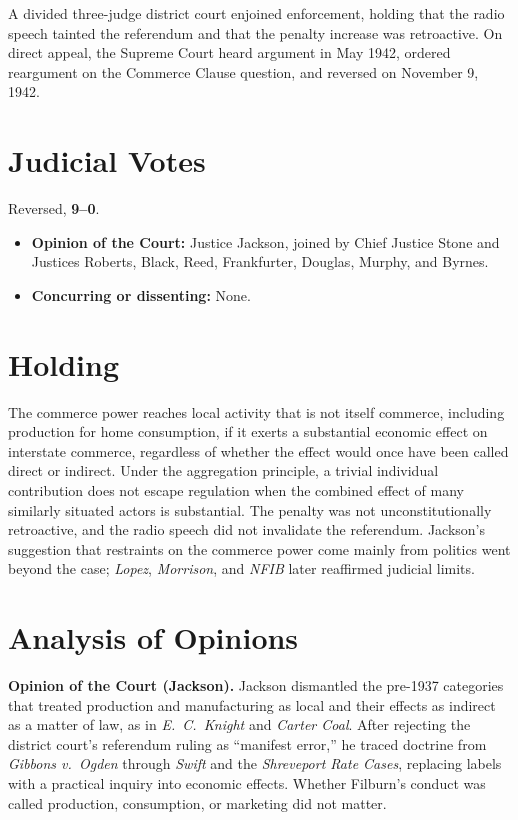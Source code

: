 \documentclass[12pt]{article}
\begin{document}
A divided three-judge district court enjoined enforcement, holding that the radio speech tainted the referendum and that the penalty increase was retroactive. On direct appeal, the Supreme Court heard argument in May 1942, ordered reargument on the Commerce Clause question, and reversed on November 9, 1942.

\section{Judicial Votes}

Reversed, \textbf{9--0}.
\begin{itemize}
\item \textbf{Opinion of the Court:} Justice Jackson, joined by Chief Justice Stone and Justices Roberts, Black, Reed, Frankfurter, Douglas, Murphy, and Byrnes.
\item \textbf{Concurring or dissenting:} None.
\end{itemize}

\section{Holding}

The commerce power reaches local activity that is not itself commerce, including production for home consumption, if it exerts a substantial economic effect on interstate commerce, regardless of whether the effect would once have been called direct or indirect. Under the aggregation principle, a trivial individual contribution does not escape regulation when the combined effect of many similarly situated actors is substantial. The penalty was not unconstitutionally retroactive, and the radio speech did not invalidate the referendum. Jackson's suggestion that restraints on the commerce power come mainly from politics went beyond the case; \textit{Lopez}, \textit{Morrison}, and \textit{NFIB} later reaffirmed judicial limits.

\section{Analysis of Opinions}

\textbf{Opinion of the Court (Jackson).} Jackson dismantled the pre-1937 categories that treated production and manufacturing as local and their effects as indirect as a matter of law, as in \textit{E.\ C.\ Knight} and \textit{Carter Coal}. After rejecting the district court's referendum ruling as ``manifest error,'' he traced doctrine from \textit{Gibbons v.\ Ogden} through \textit{Swift} and the \textit{Shreveport Rate Cases}, replacing labels with a practical inquiry into economic effects. Whether Filburn's conduct was called production, consumption, or marketing did not matter.
\end{document}
